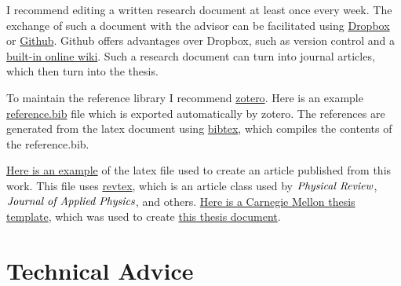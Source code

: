 I recommend editing a written research document at least once every week. 
The exchange of such a document with the advisor can be facilitated using 
\href{https://www.dropbox.com/}{Dropbox} or 
\href{https://github.com/}{Github}. 
Github offers advantages over Dropbox, such as version control and a 
\href{https://github.com/ntpl/ntpy/wiki}{built-in online wiki}. 
Such a research document can turn into journal articles, 
which then turn into the thesis.  

To maintain the reference library I 
recommend 
\href{http://www.zotero.org/}{zotero}.  Here is an example 
\href{https://github.com/jasonlarkin/disorder/blob/master/paper/vc/jap/ntpl-032013.bib}
{reference.bib} 
file which is exported automatically by zotero. 
The references are generated from the latex document using 
\href{http://www.bibtex.org/Using/}{bibtex}, which compiles the contents of 
the reference.bib.

\href{https://github.com/jasonlarkin/disorder/blob/master/paper/vc/jap/jap_vc_jl_060413.tex}
{Here is an example} of the latex file 
used to create an article published from this work. 
This file uses 
\href{http://publish.aps.org/revtex}{revtex}, 
which is an article class used by $\emph{Physical Review}$, 
$\emph{Journal of Applied Physics}$, and others.
\href{https://github.com/robsimmons/cmu-thesis}
{Here is a Carnegie Mellon thesis template}, 
which was used to create 
\href{https://github.com/jasonlarkin/thesis/tree/master/thesis}
{this thesis document}.

% 
% 
% 

\section{Technical Advice}

